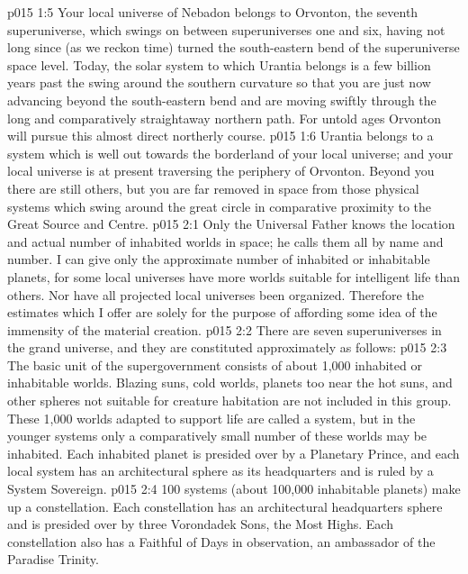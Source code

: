 \vs p015 1:5 Your local universe of Nebadon belongs to Orvonton, the seventh superuniverse, which swings on between superuniverses one and six, having not long since (as we reckon time) turned the south\hyp{}eastern bend of the superuniverse space level. Today, the solar system to which Urantia belongs is a few billion years past the swing around the southern curvature so that you are just now advancing beyond the south\hyp{}eastern bend and are moving swiftly through the long and comparatively straightaway northern path. For untold ages Orvonton will pursue this almost direct northerly course.
\vs p015 1:6 Urantia belongs to a system which is well out towards the borderland of your local universe; and your local universe is at present traversing the periphery of Orvonton. Beyond you there are still others, but you are far removed in space from those physical systems which swing around the great circle in comparative proximity to the Great Source and Centre.
\vs p015 2:1 Only the Universal Father knows the location and actual number of inhabited worlds in space; he calls them all by name and number. I can give only the approximate number of inhabited or inhabitable planets, for some local universes have more worlds suitable for intelligent life than others. Nor have all projected local universes been organized. Therefore the estimates which I offer are solely for the purpose of affording some idea of the immensity of the material creation.
\vs p015 2:2 \pc There are seven superuniverses in the grand universe, and they are constituted approximately as follows:
\vs p015 2:3 \bibnobreakspace {} The basic unit of the supergovernment consists of about 1,000 inhabited or inhabitable worlds. Blazing suns, cold worlds, planets too near the hot suns, and other spheres not suitable for creature habitation are not included in this group. These 1,000 worlds adapted to support life are called a system, but in the younger systems only a comparatively small number of these worlds may be inhabited. Each inhabited planet is presided over by a Planetary Prince, and each local system has an architectural sphere as its headquarters and is ruled by a System Sovereign.
\vs p015 2:4 \bibnobreakspace {} 100 systems (about 100,000 inhabitable planets) make up a constellation. Each constellation has an architectural headquarters sphere and is presided over by three Vorondadek Sons, the Most Highs. Each constellation also has a Faithful of Days in observation, an ambassador of the Paradise Trinity.
